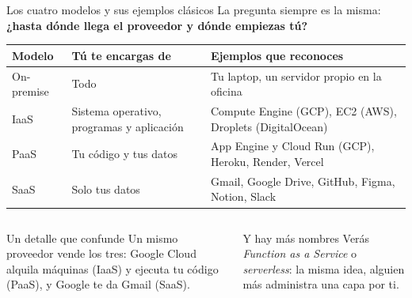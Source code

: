 \documentclass[aspectratio=169,10pt,c]{beamer}
\begin{document}
\begin{frame}{Los cuatro modelos y sus ejemplos clásicos}
\small La pregunta siempre es la misma: \textbf{¿hasta dónde llega el proveedor y dónde empiezas tú?}
\par\vspace{2mm}
\renewcommand{\arraystretch}{1.35}
\centering\small
\begin{tabular}{@{}p{1.9cm}p{4.4cm}p{6.6cm}@{}}
\toprule
\textbf{Modelo} & \textbf{Tú te encargas de} & \textbf{Ejemplos que reconoces}\\
\midrule
On-premise & Todo & Tu laptop, un servidor propio en la oficina\\
IaaS & Sistema operativo, programas y aplicación & Compute Engine (GCP), EC2 (AWS), Droplets (DigitalOcean)\\
PaaS & Tu código y tus datos & App Engine y Cloud Run (GCP), Heroku, Render, Vercel\\
SaaS & Solo tus datos & Gmail, Google Drive, GitHub, Figma, Notion, Slack\\
\bottomrule
\end{tabular}
\par\vspace{2mm}
\begin{columns}[T,onlytextwidth]
\begin{exampleblock}{Un detalle que confunde}
\footnotesize Un mismo proveedor vende los tres: Google Cloud alquila máquinas (IaaS) y ejecuta tu código (PaaS), y Google te da Gmail (SaaS).
\end{exampleblock}
\begin{block}{Y hay más nombres}
\footnotesize Verás \emph{Function as a Service} o \emph{serverless}: la misma idea, alguien más administra una capa por ti.
\end{block}
\end{columns}
\end{frame}
\end{document}
